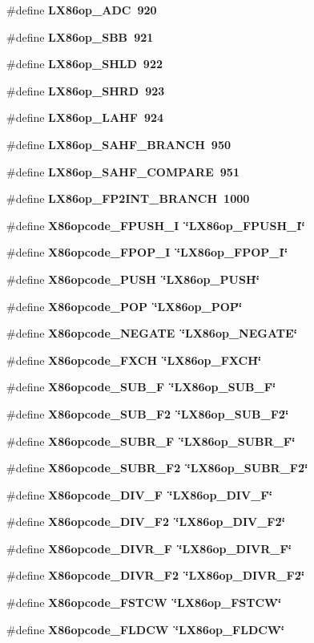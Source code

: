 \begin{CompactItemize}
\#define \bf{LX86op\_\-ADC}~920
\item 
\#define \bf{LX86op\_\-SBB}~921
\item 
\#define \bf{LX86op\_\-SHLD}~922
\item 
\#define \bf{LX86op\_\-SHRD}~923
\item 
\#define \bf{LX86op\_\-LAHF}~924
\item 
\#define \bf{LX86op\_\-SAHF\_\-BRANCH}~950
\item 
\#define \bf{LX86op\_\-SAHF\_\-COMPARE}~951
\item 
\#define \bf{LX86op\_\-FP2INT\_\-BRANCH}~1000
\item 
\#define \bf{X86opcode\_\-FPUSH\_\-I}~\char`\"{}LX86op\_\-FPUSH\_\-I\char`\"{}
\item 
\#define \bf{X86opcode\_\-FPOP\_\-I}~\char`\"{}LX86op\_\-FPOP\_\-I\char`\"{}
\item 
\#define \bf{X86opcode\_\-PUSH}~\char`\"{}LX86op\_\-PUSH\char`\"{}
\item 
\#define \bf{X86opcode\_\-POP}~\char`\"{}LX86op\_\-POP\char`\"{}
\item 
\#define \bf{X86opcode\_\-NEGATE}~\char`\"{}LX86op\_\-NEGATE\char`\"{}
\item 
\#define \bf{X86opcode\_\-FXCH}~\char`\"{}LX86op\_\-FXCH\char`\"{}
\item 
\#define \bf{X86opcode\_\-SUB\_\-F}~\char`\"{}LX86op\_\-SUB\_\-F\char`\"{}
\item 
\#define \bf{X86opcode\_\-SUB\_\-F2}~\char`\"{}LX86op\_\-SUB\_\-F2\char`\"{}
\item 
\#define \bf{X86opcode\_\-SUBR\_\-F}~\char`\"{}LX86op\_\-SUBR\_\-F\char`\"{}
\item 
\#define \bf{X86opcode\_\-SUBR\_\-F2}~\char`\"{}LX86op\_\-SUBR\_\-F2\char`\"{}
\item 
\#define \bf{X86opcode\_\-DIV\_\-F}~\char`\"{}LX86op\_\-DIV\_\-F\char`\"{}
\item 
\#define \bf{X86opcode\_\-DIV\_\-F2}~\char`\"{}LX86op\_\-DIV\_\-F2\char`\"{}
\item 
\#define \bf{X86opcode\_\-DIVR\_\-F}~\char`\"{}LX86op\_\-DIVR\_\-F\char`\"{}
\item 
\#define \bf{X86opcode\_\-DIVR\_\-F2}~\char`\"{}LX86op\_\-DIVR\_\-F2\char`\"{}
\item 
\#define \bf{X86opcode\_\-FSTCW}~\char`\"{}LX86op\_\-FSTCW\char`\"{}
\item 
\#define \bf{X86opcode\_\-FLDCW}~\char`\"{}LX86op\_\-FLDCW\char`\"{}
\item 

\end{CompactItemize}
